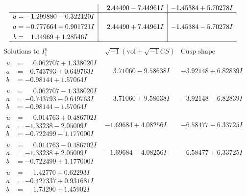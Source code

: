 \documentclass[1p]{elsarticle_modified}
\theoremstyle{definition}
\newcommand{\I}{\sqrt{-1}}
\begin{document}
$$\begin{array}{c|c|c}
 & \phantom{-}2.44490 - 7.44961 I & -1.45384 + 5.70278 I \\ \hline\begin{aligned}
u &= -1.299880 - 0.322120 I \\
a &= -0.777664 + 0.901721 I \\
b &= \phantom{-}1.34969 + 1.28546 I\end{aligned}
 & \phantom{-}2.44490 + 7.44961 I & -1.45384 - 5.70278 I\\
 \hline 
 \end{array}$$\newpage$$\begin{array}{c|c|c}  
\text{Solutions to }I^u_{1}& \I (\text{vol} + \sqrt{-1}CS) & \text{Cusp shape}\\
 \hline 
\begin{aligned}
u &= \phantom{-}0.062707 + 1.338020 I \\
a &= -0.743793 + 0.649763 I \\
b &= -0.98144 + 1.57064 I\end{aligned}
 & \phantom{-}3.71060 - 9.58638 I & -3.92148 + 6.82839 I \\ \hline\begin{aligned}
u &= \phantom{-}0.062707 - 1.338020 I \\
a &= -0.743793 - 0.649763 I \\
b &= -0.98144 - 1.57064 I\end{aligned}
 & \phantom{-}3.71060 + 9.58638 I & -3.92148 - 6.82839 I \\ \hline\begin{aligned}
u &= \phantom{-}0.014763 + 0.486702 I \\
a &= -1.33238 - 2.05009 I \\
b &= -0.722499 - 1.177000 I\end{aligned}
 & -1.69684 + 4.08256 I & -6.58477 - 6.33725 I \\ \hline\begin{aligned}
u &= \phantom{-}0.014763 - 0.486702 I \\
a &= -1.33238 + 2.05009 I \\
b &= -0.722499 + 1.177000 I\end{aligned}
 & -1.69684 - 4.08256 I & -6.58477 + 6.33725 I \\ \hline\begin{aligned}
u &= \phantom{-}1.42770 + 0.62293 I \\
a &= -0.427337 + 0.931681 I \\
b &= \phantom{-}1.73290 + 1.45902 I\end{aligned}

\end{array}$$
\end{document}
